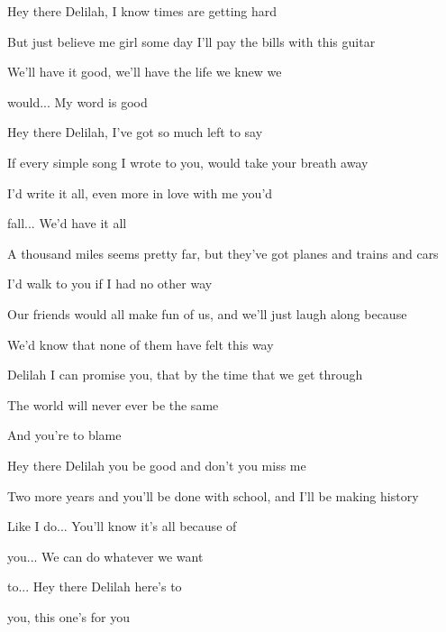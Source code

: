 \begin{song}
\bigskip

 Hey there Delilah, I know times are getting hard \par
But just believe me girl some day I'll pay the bills with this guitar \par
We'll have it good,  we'll have the life we knew we \par
{}would... My word is good \par

\bigskip

 Hey there Delilah, I've got so much left to say \par
If every simple song I wrote to you, would take your breath away \par
I'd write it all, even more in love with me you'd \par
{}fall... We'd have it all \par

\bigskip

\Chorus

\bigskip

A thousand miles seems pretty far, but they've got planes and trains and cars \par
I'd walk to you if I had no other way \par
Our friends would all make fun of us, and we'll just laugh along because  \par
We'd know that none of them have felt this way \par
Delilah I can promise you, that by the time that we get through \par
The world will never ever be the same \par
And you're to blame \par

\bigskip

 Hey there Delilah you be good and don't you miss me \par
Two more years and you'll be done with school, and I'll be making history \par
Like I do...  You'll know it's all because of \par
{}you... We can do whatever we want \par
{}to...  Hey there Delilah here's to \par
{}you, this one’s for you \par

\bigskip

\Chorus

\end{song}
